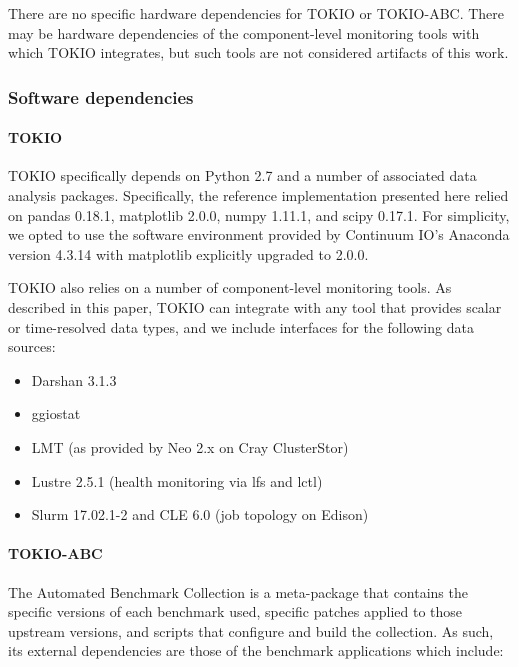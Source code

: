 There are no specific hardware dependencies for TOKIO or TOKIO-ABC.
There may be hardware dependencies of the component-level monitoring tools with which TOKIO integrates, but such tools are not considered artifacts of this work.

\subsubsection{Software dependencies}

\paragraph{TOKIO}

TOKIO specifically depends on Python 2.7 and a number of associated data analysis packages.
Specifically, the reference implementation presented here relied on pandas 0.18.1, matplotlib 2.0.0, numpy 1.11.1, and scipy 0.17.1.
For simplicity, we opted to use the software environment provided by Continuum IO's Anaconda version 4.3.14 with matplotlib explicitly upgraded to 2.0.0.

TOKIO also relies on a number of component-level monitoring tools.
As described in this paper, TOKIO can integrate with any tool that provides scalar or time-resolved data types, and we include interfaces for the following data sources:

\begin{itemize}
\item Darshan 3.1.3 %
\item ggiostat
\item LMT (as provided by Neo 2.x on Cray ClusterStor) %
\item Lustre 2.5.1 (health monitoring via lfs and lctl)
\item Slurm 17.02.1-2 and CLE 6.0 (job topology on Edison)
\end{itemize}

\paragraph{TOKIO-ABC} The Automated Benchmark Collection is a meta-package that contains the specific versions of each benchmark used, specific patches applied to those upstream versions, and scripts that configure and build the collection.
As such, its external dependencies are those of the benchmark applications which include:

